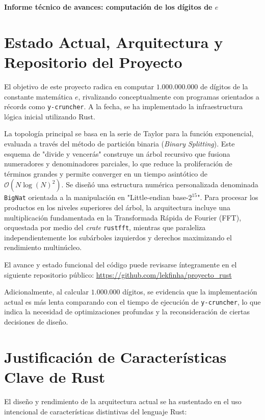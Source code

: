 \documentclass[12pt]{article}
\begin{document}
\begin{center}
    \Large \textbf{Informe técnico de avances: computación de los dígitos de $e$}
\end{center}

\section{Estado Actual, Arquitectura y Repositorio del Proyecto}
El objetivo de este proyecto radica en computar $1.000.000.000$ de dígitos de la constante matemática $e$, rivalizando conceptualmente con programas orientados a récords como \texttt{y-cruncher}. A la fecha, se ha implementado la infraestructura lógica inicial utilizando Rust.

La topología principal se basa en la serie de Taylor para la función exponencial, evaluada a través del método de partición binaria (\textit{Binary Splitting}). Este esquema de "divide y vencerás" construye un árbol recursivo que fusiona numeradores y denominadores parciales, lo que reduce la proliferación de términos grandes y permite converger en un tiempo asintótico de $\mathcal{O}(N\log(N)^2)$. Se diseñó una estructura numérica personalizada denominada \texttt{BigNat} orientada a la manipulación en "Little-endian base-$2^{15}$". Para procesar los productos en los niveles superiores del árbol, la arquitectura incluye una multiplicación fundamentada en la Transformada Rápida de Fourier (FFT), orquestada por medio del \textit{crate} \texttt{rustfft}, mientras que paraleliza independientemente los subárboles izquierdos y derechos maximizando el rendimiento multinúcleo.

El avance y estado funcional del código puede revisarse íntegramente en el siguiente repositorio público: \url{https://github.com/lekfinha/proyecto_rust}

Adicionalmente, al calcular $1.000.000$ dígitos, se evidencia que la implementación actual es más lenta comparando con el tiempo de ejecución de \texttt{y-cruncher}, lo que indica la necesidad de optimizaciones profundas y la reconsideración de ciertas decisiones de diseño.

\section{Justificación de Características Clave de Rust}
El diseño y rendimiento de la arquitectura actual se ha sustentado en el uso intencional de características distintivas del lenguaje Rust:
\end{document}

